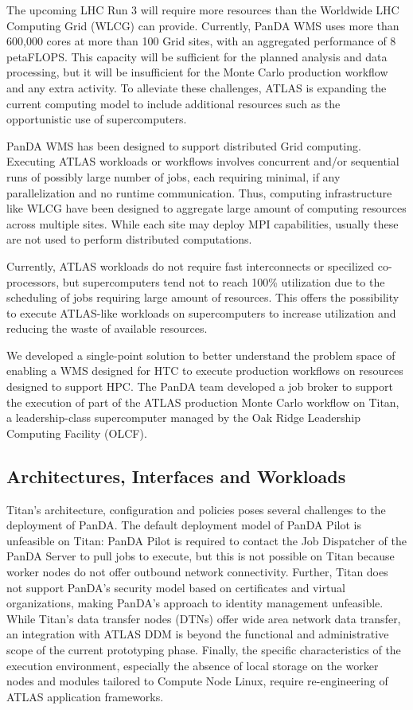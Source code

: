The upcoming LHC Run 3 will require more resources than the Worldwide LHC
Computing Grid (WLCG) can provide. Currently, PanDA WMS uses more than
600,000 cores at more than 100 Grid sites, with an aggregated performance of
8 petaFLOPS\@. This capacity will be sufficient for the planned analysis and
data processing, but it will be insufficient for the Monte Carlo production
workflow and any extra activity. To alleviate these challenges, ATLAS is
expanding the current computing model to include additional resources such as
the opportunistic use of supercomputers.

PanDA WMS has been designed to support distributed Grid computing. Executing
ATLAS workloads or workflows involves concurrent and/or sequential runs of
possibly large number of jobs, each requiring minimal, if any parallelization
and no runtime communication. Thus, computing infrastructure like WLCG have
been designed to aggregate large amount of computing resources across
multiple sites. While each site may deploy MPI capabilities, usually these
are not used to perform distributed computations.

Currently, ATLAS workloads do not require fast interconnects or specilized
co-processors, but supercomputers tend not to reach 100\% utilization due to
the scheduling of jobs requiring large amount of resources. This offers the
possibility to execute ATLAS-like workloads on supercomputers to increase
utilization and reducing the waste of available resources.

We developed a single-point solution to better understand the problem space
of enabling a WMS designed for HTC to execute production workflows on
resources designed to support HPC\@. The PanDA team developed a job broker to
support the execution of part of the ATLAS production Monte Carlo workflow on
Titan, a leadership-class supercomputer managed by the Oak Ridge Leadership
Computing Facility (OLCF).

\subsection{Architectures, Interfaces and Workloads}\label{ssec:panda-titan}

Titan's architecture, configuration and policies poses several challenges to
the deployment of PanDA\@. The default deployment model of PanDA Pilot is
unfeasible on Titan: PanDA Pilot is required to contact the Job Dispatcher of
the PanDA Server to pull jobs to execute, but this is not possible on Titan
because worker nodes do not offer outbound network connectivity. Further,
Titan does not support PanDA's security model based on certificates and
virtual organizations, making PanDA's approach to identity management
unfeasible. While Titan's data transfer nodes (DTNs) offer wide area network
data transfer, an integration with ATLAS DDM is beyond the functional and
administrative scope of the current prototyping phase. Finally, the specific
characteristics of the execution environment, especially the absence of local
storage on the worker nodes and modules tailored to Compute Node Linux,
require re-engineering of ATLAS application frameworks.

